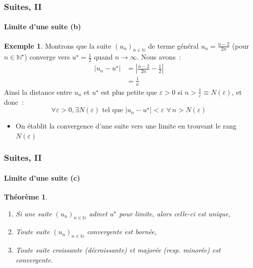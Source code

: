 \documentclass[10pt,notheorems]{beamer}
\theoremstyle{plain}
\newtheorem{theorem}{Théorème}
\theoremstyle{definition} %
\newtheorem{example}{Exemple}
\begin{document}
\begin{frame}
  \frametitle{Suites, II}
  \framesubtitle{Limite d'une suite (b)}
  \hypertarget{slide_suite_limite_2}{}

  \bigskip

  \begin{example}
    Montrons que la suite $(u_n)_{n\in\mathbb N}$ de terme général $u_n = \frac{n-2}{2n}$ (pour $n\in\mathbb N^{\star}$) converge vers $u^{\star} = \frac{1}{2}$ quand $n\rightarrow\infty$. Nous avons~:
    \[
      \begin{split}
        |u_n-u^{\star}| &= \left|\frac{n-2}{2n}-\frac{1}{2}\right|\\
        &= \frac{1}{n}
      \end{split}
    \]
    Ainsi la distance entre $u_n$ et $u^{\star}$ est plus petite que $\varepsilon>0$ si $n>\frac{1}{\varepsilon}\equiv N(\varepsilon)$, et donc~:
    \[
      \forall \varepsilon>0, \exists N(\varepsilon) \text{ tel que } |u_n-u^{\star}|<\varepsilon\,\, \forall \, n>N(\varepsilon)
    \]
  \end{example}

  \bigskip

  \begin{itemize}

  \item On établit la convergence d'une suite vers une limite en trouvant le rang $N(\varepsilon)$

  \end{itemize}

\end{frame}


\begin{frame}
  \frametitle{Suites, II}
  \framesubtitle{Limite d'une suite (c)}
  \hypertarget{slide_suite_limite_3}{}

  \bigskip

  \begin{theorem}
    \medskip
    \begin{enumerate}

    \item Si une suite $(u_n)_{n\in\mathbb N}$ admet $u^{\star}$ pour limite, alors celle-ci est unique,\newline

    \item Toute suite $(u_n)_{n\in\mathbb N}$ convergente est bornée,\newline

    \item Toute suite croissante (décroissante) et majorée (resp. minorée) est convergente.\newline

    \end{enumerate}
  \end{theorem}

\end{frame}
\end{document}

